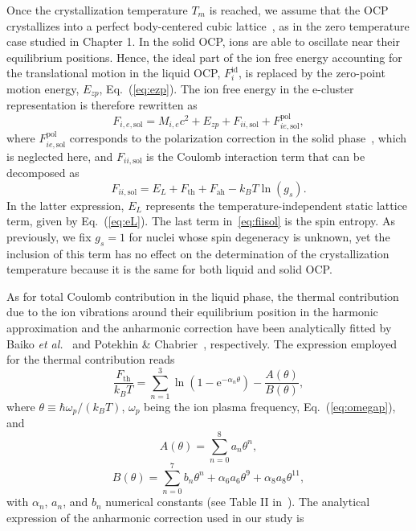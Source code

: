 Once the crystallization temperature $T_m$ is reached, we assume that the OCP 
crystallizes into a perfect body-centered cubic lattice~\cite{Chamel2016}, as
in the zero temperature case studied in Chapter 1. In the solid OCP, ions are
able to oscillate near their equilibrium positions. Hence, the ideal 
part of the ion free energy accounting for the translational motion in the 
liquid OCP, $F_{i}^{\text{id}}$, is replaced by the zero-point motion energy, 
$E_{zp}$, Eq.~(\ref{eq:ezp}). The ion free energy in the e-cluster
representation is therefore rewritten as
%
\begin{equation}
  F_{i,e,\text{sol}} = M_{i,e}c^2 + E_{zp} + F_{ii,\text{sol}} +
  F_{ie,\text{sol}}^{\text{pol}},
\end{equation}
%
where $F_{ie,\text{sol}}^{\text{pol}}$ corresponds to the polarization
correction in the solid phase~\cite{Potekhin2000}, which is neglected here, and
$F_{ii,\text{sol}}$ is the Coulomb interaction term that can be decomposed as
%
\begin{equation}
  F_{ii,\text{sol}} = E_L + F_{\text{th}} + F_{\text{ah}} - k_B
  T\ln(g_s).\label{eq:fiisol}
\end{equation}
%
In the latter expression, $E_L$ represents the temperature-independent static 
lattice term, given by Eq.~(\ref{eq:eL}). The last term in~\ref{eq:fiisol} is
the spin entropy. As previously, we fix $g_s=1$ for nuclei whose spin 
degeneracy is unknown, yet the inclusion of this term has no effect on the 
determination of the crystallization temperature because it is the same for 
both liquid and solid OCP.

As for total Coulomb contribution in the liquid phase, the thermal
contribution due to the ion vibrations around their equilibrium position in the 
harmonic approximation and the anharmonic correction have been analytically
fitted by Baiko \textit{et al.}~\cite{Baiko2001} and Potekhin \&
Chabrier~\cite{Potekhin2010}, respectively. 
The expression employed for the thermal contribution reads~\cite{Baiko2001}
%
\begin{equation}
  \frac{F_{\text{th}}}{k_B T} = \sum_{n=1}^3\ln\left(1
    -\text{e}^{-\alpha_n\theta}\right) 
  - \frac{A(\theta)}{B(\theta)},
\end{equation}
%
where $\theta \equiv \hbar\omega_p/(k_B T)$, $\omega_p$ being the ion plasma
frequency, Eq.~(\ref{eq:omegap}), and
%
\begin{equation}
  A(\theta) = \sum_{n=0}^{8}a_n\theta^n,
\end{equation}
%
\begin{equation}
  B(\theta) = \sum_{n=0}^{7}b_n\theta^n 
  + \alpha_6 a_6 \theta^9 
  + \alpha_8 a_8 \theta^{11},
\end{equation}
%
with $\alpha_n$, $a_n$, and $b_n$ numerical constants (see Table II
in~\cite{Baiko2001}).
The analytical expression of the anharmonic correction used in our study
is~\cite{Potekhin2010}

